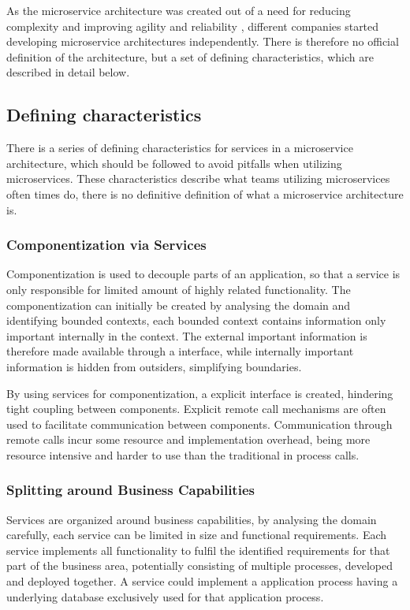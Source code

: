 As the microservice architecture was created out of a need for reducing complexity and improving agility and reliability \cite[p.~68]{long2017cloud} \cite[p.~192]{newman2015microservices}, different companies started developing microservice architectures independently. There is therefore no official definition of the architecture, but a set of defining characteristics, which are described in detail below.

\subsection{Defining characteristics}
There is a series of defining characteristics for services in a microservice architecture, which should be followed to avoid pitfalls when utilizing microservices. These characteristics describe what teams utilizing microservices often times do, there is no definitive definition of what a microservice architecture is.

\subsubsection*{Componentization via Services}
Componentization is used to decouple parts of an application, so that a service is only responsible for limited amount of highly related functionality\cite{morgantini2013whatAreMicroServices}. The componentization can initially be created by analysing the domain and identifying bounded contexts\cite[p.~31]{newman2015microservices}, each bounded context contains information only important internally in the context. 
The external important information is therefore made available through a interface, while internally important information is hidden from outsiders, simplifying boundaries.

By using services for componentization, a explicit interface is created, hindering tight coupling between components. Explicit remote call mechanisms are often used to facilitate communication between components. Communication through remote calls incur some resource and implementation overhead, being more resource intensive and harder to use than the traditional in process calls.

\subsubsection*{Splitting around Business Capabilities}
Services are organized around business capabilities, by analysing the domain carefully, each service can be limited in size and functional requirements. Each service implements all functionality to fulfil the identified requirements for that part of the business area, potentially consisting of multiple processes, developed and deployed together. A service could implement a application process having a underlying database exclusively used for that application process\cite{fowler2014microservices}.

